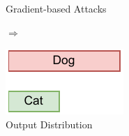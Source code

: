 \begin{frame}{Gradient-based Attacks}
\begin{minipage}{0.2\linewidth}
    \end{minipage}\hfill
    $\Rightarrow$\hfill
    \begin{minipage}{0.2\linewidth}
        \centering
        \includegraphics[width=\linewidth]{assets/wrong_y_prob.pdf}\\
        Output Distribution
    \end{minipage}
\end{frame}





